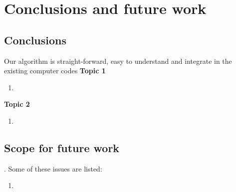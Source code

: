 
\chapter{Conclusions and future work}

\label{Chapter8} %


\section{Conclusions}

Our algorithm is straight-forward, easy to understand and integrate in the existing computer codes
\textbf{Topic 1}

\begin{enumerate}
       
    \item \lipsum[2]

\end{enumerate}

\textbf{Topic 2}

\begin{enumerate}

    \item \lipsum[2]
     
\end{enumerate}

\section{Scope for future work}

\lipsum[1]. Some of these issues are listed:

\begin{enumerate}

    \item \lipsum[2]

\end{enumerate}

